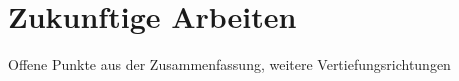 \chapter{Zukunftige Arbeiten}
\label{futurework}

Offene Punkte aus der Zusammenfassung, weitere Vertiefungsrichtungen

